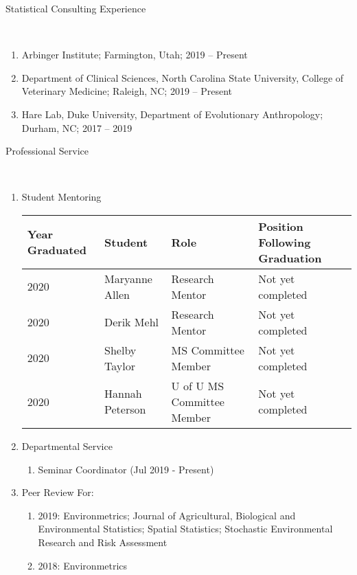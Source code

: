 \documentclass[12pt]{article}
\newcommand{\head}[1]{ %
    \bigskip %
    \begin{large}\begin{bf}{#1}\end{bf}\end{large} %

    \ \\ [-1.3cm] %

    \hrulefill}
\begin{document}
\head{Statistical Consulting Experience}

\begin{enumerate}[label=$\bullet$]

\item Arbinger Institute; Farmington, Utah; 2019 -- Present

\item Department of Clinical Sciences, North Carolina State University, College of Veterinary Medicine; Raleigh, NC; 2019 -- Present

\item Hare Lab, Duke University, Department of Evolutionary Anthropology; Durham, NC; 2017 -- 2019

\end{enumerate}



\head{Professional Service}
\begin{enumerate}[label=$\bullet$]

\item Student Mentoring

\begin{table}[H]
\centering
\begin{tabular}{llll}
  \hline
Year Graduated & Student & Role & Position Following Graduation \\ 
  \hline
2020  & Maryanne Allen & Research Mentor & Not yet completed \\ 
2020  & Derik Mehl & Research Mentor & Not yet completed  \\ 
2020  & Shelby Taylor & MS Committee Member & Not yet completed  \\ 
2020  & Hannah Peterson & U of U MS Committee Member & Not yet completed  \\ 
   \hline
\end{tabular}
\end{table}

\item Departmental Service
\begin{enumerate}[label=$\cdot$]
\item Seminar Coordinator (Jul 2019 - Present)
\end{enumerate}

\item Peer Review For:
\begin{enumerate}[label=$\cdot$]
\item 2019: Environmetrics; Journal of Agricultural, Biological and Environmental Statistics; Spatial Statistics; Stochastic Environmental Research and Risk Assessment 
\item 2018: Environmetrics 
\end{enumerate}
\end{enumerate}
\end{document}
